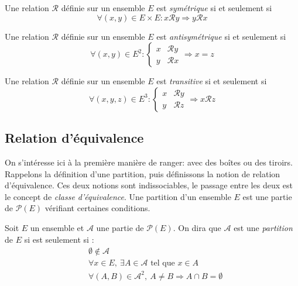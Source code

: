 \begin{defi}
  Une relation $\mathcal R$ définie sur un ensemble $E$ est \emph{symétrique} si et seulement si 
\begin{displaymath}
 \forall (x,y)\in E\times E  : x \mathcal R y \Rightarrow y \mathcal R x
\end{displaymath}
 \end{defi}

\begin{defi}
  Une relation $\mathcal R$ définie sur un ensemble $E$ est \emph{antisymétrique} si et seulement si 
\begin{equation*}
 \forall (x,y)\in E^2  : 
\left\lbrace 
\begin{aligned}
x &\mathcal R y \\
y &\mathcal R x
\end{aligned}
\right. 
 \Rightarrow x = z
\end{equation*}
 \end{defi}


 \begin{defi}
  Une relation $\mathcal R$ définie sur un ensemble $E$ est \emph{transitive} si et seulement si 
\begin{equation*}
 \forall (x,y,z)\in E^3  : 
\left\lbrace 
\begin{aligned}
x &\mathcal R y \\
y &\mathcal R z
\end{aligned}
\right. 
 \Rightarrow x \mathcal R z
\end{equation*}
 \end{defi}

\subsection{Relation d'équivalence}
On s'intéresse ici à la première manière de ranger: avec des boîtes ou des tiroirs. Rappelons la définition d'une partition, puis définissons la notion de relation d'équivalence. Ces deux notions sont indissociables, le passage entre les deux est le concept de \emph{classe d'équivalence}.\newline
Une partition d'un ensemble $E$ est une partie de $\mathcal{P}(E)$ vérifiant certaines conditions.
\begin{defi}[partition]
Soit $E$ un ensemble et $\mathcal{A}$ une partie de $\mathcal{P}(E)$.\newline
On dira que $\mathcal A$ est une \emph{partition} de $E$ si est seulement si :
\begin{align*}
 &\emptyset \not \in \mathcal A \\
 &\forall x\in E,\: \exists A \in \mathcal{A} \text{ tel que } x\in A \\
 &\forall (A,B)\in \mathcal{A}^2, \: A \neq B \Rightarrow A \cap B =\emptyset
\end{align*}
\end{defi}


